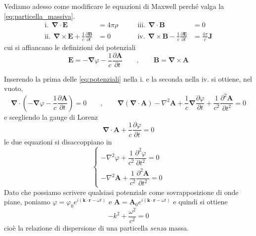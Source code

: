 Vediamo adesso come modificare le equazioni di Maxwell perché valga la \eqref{eq:particella_massiva}. 
%
\begin{equation*}
\begin{aligned}
    \text{i.} \ \ \mathbf{\nabla}\cdot\mathbf{E} &= 4\pi\rho  &\qquad \text{iii.} \ \ \mathbf{\nabla}\cdot\mathbf{B} &= 0 \\
    \text{ii.} \ \ \mathbf{\nabla}\times\mathbf{E} + \frac{1}{c}\frac{\partial \mathbf{B}}{\partial t} &= 0 &\qquad \text{iv.} \ \ \mathbf{\nabla}\times\mathbf{B} - \frac{1}{c}\frac{\partial \mathbf{E}}{\partial t} &= \frac{4\pi}{c}\mathbf{J}
\end{aligned}
\end{equation*}
cui si affiancano le definizioni dei potenziali
%
\begin{equation}
    \mathbf{E} = -\mathbf{\nabla}\varphi - \frac{1}{c}\frac{\partial \mathbf{A}}{\partial t} \qquad , \qquad \mathbf{B} = \mathbf{\nabla}\times\mathbf{A}
    \label{eq:potenziali}
\end{equation}

Inserendo la prima delle \eqref{eq:potenziali} nella i. e la seconda nella iv. si ottiene, nel vuoto,
%
\begin{equation*}
    \mathbf{\nabla}\cdot\left(-\mathbf{\nabla}\varphi - \frac{1}{c}\frac{\partial \mathbf{A}}{\partial t}\right) = 0 \qquad , \qquad \mathbf{\nabla}\left(\mathbf{\nabla}\cdot\mathbf{A}\right) - \nabla^2 \mathbf{A} + \frac{1}{c}\mathbf{\nabla}\frac{\partial \varphi}{\partial t} + \frac{1}{c^2}\frac{\partial^2 \mathbf{A}}{\partial t^2} = 0
\end{equation*}
e scegliendo la gauge di Lorenz
%
\begin{equation*}
    \mathbf{\nabla}\cdot\mathbf{A} + \frac{1}{c}\frac{\partial \varphi}{\partial t} = 0
\end{equation*}
le due equazioni si disaccoppiano in
%
\begin{equation}
\begin{cases}
    -\nabla^2 \varphi + \dfrac{1}{c^2}\dfrac{\partial^2 \varphi}{\partial t^2} = 0 \\[8pt]
    -\nabla^2 \mathbf{A} + \dfrac{1}{c^2}\dfrac{\partial^2 \mathbf{A}}{\partial t^2} = 0
\end{cases}
\end{equation}
Dato che possiamo scrivere qualsiasi potenziale come sovrapposizione di onde piane, poniamo $\varphi = \varphi_0 e^{i(\mathbf{k}\cdot\mathbf{r} - \omega t)}$ e $\mathbf{A} = \mathbf{A}_0 e^{i(\mathbf{k}\cdot\mathbf{r}-\omega t)}$ e quindi si ottiene
%
\begin{equation*}
    -k^2 + \frac{\omega^2}{c^2} = 0
\end{equation*}
cioè la relazione di dispersione di una particella \emph{senza} massa.\\

